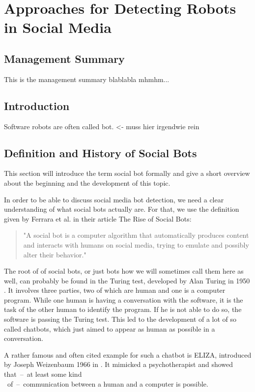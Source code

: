 \newpage
\chapter{Approaches for Detecting Robots \\ in Social Media}
\section*{Management Summary}
This is the management summary blablabla mhmhm...

\section{Introduction}
Software robots are often called bot. <- muss hier irgendwie rein 

\section{Definition and History of Social Bots} 
This section will introduce the term social bot formally and give a short overview about the beginning and the development of this topic.

In order to be able to discuss social media bot detection, we need a clear understanding of what social bots actually are.  For that, we use the definition given by Ferrara et al. in their article The Rise of Social Bots:
\begin{quote}
	"A social bot is a computer algorithm that automatically produces content and interacts with humans on social media, trying to emulate and possibly alter their behavior." \cite{ferrara15}
\end{quote}

The root of of social bots, or just bots how we will sometimes call them here as well, can probably be found in the Turing test, developed by Alan Turing in 1950 \cite{turing}. It involves three parties, two of which are human and one is a computer program. While one human is having a conversation with the software, it is the task of the other human to identify the program. If he is not able to do so, the software is passing the Turing test. This led to the development of a lot of so called chatbots, which just aimed to appear as human as possible in a conversation.  

A rather famous and often cited example for such a chatbot is ELIZA, introduced by Joseph Weizenbaum 1966 in \cite{eliza}. It mimicked a psychotherapist and showed \mbox{that -- at} least some kind\\ \mbox{ of -- communication} between a human and a computer is possible.

